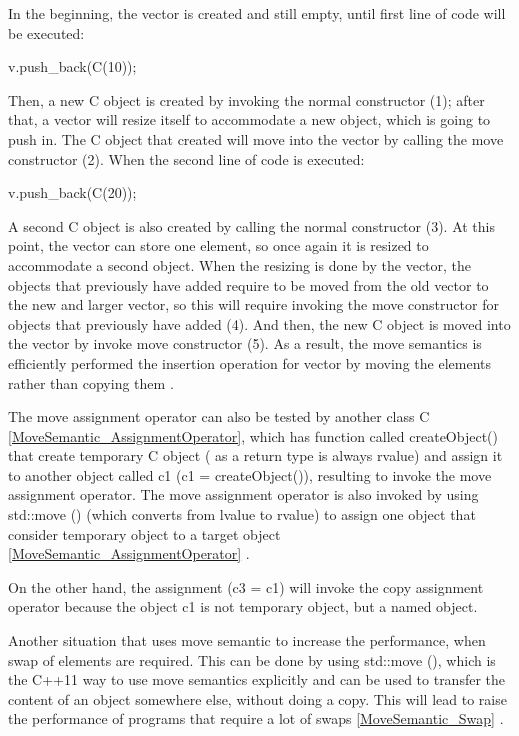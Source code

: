 \documentclass[11pt]{report}
\begin{document}
In the beginning, the vector is created and still empty, until first line of code will be executed:
\begin{center}
v.push\_back(C(10));
\end{center} 

Then, a new C object is created by invoking the normal constructor (1); after that, a vector will resize itself to accommodate a new object, which is going to push in. The C object that created will move into the vector by calling the move constructor (2). When the second line of code is executed:
\begin{center}
v.push\_back(C(20));
\end{center}

A second C object is also created by calling the normal constructor (3). At this point, the vector can store one element, so once again it is resized to accommodate a second object. When the resizing is done by the vector, the objects that previously have added require to be moved from the old vector to the new and larger vector, so this will require invoking the move constructor for objects that previously have added (4). And then, the new C object is moved into the vector by invoke move constructor (5). As a result, the move semantics is efficiently performed the insertion operation for vector by moving the elements rather than copying them \cite{MSDN:2012:CppModern}.


The move assignment operator can also be tested by another class C \ref{MoveSemantic_AssignmentOperator}, which has function called createObject() that create temporary C object ( as a return type is always rvalue) and assign it to another object called c1  (c1 = createObject()), resulting to invoke the move assignment operator. The move assignment operator is also invoked by using std::move () (which converts from lvalue to rvalue) to assign one object that consider temporary object to a target object \ref{MoveSemantic_AssignmentOperator} \cite{MSDN:2012:CppModern}.

On the other hand, the assignment (c3 = c1) will invoke the copy assignment operator because the object c1 is not temporary object, but a named object.


Another situation that uses move semantic to increase the performance, when swap of elements are required. This can be done by using std::move (), which is the C++11 way to use move semantics explicitly and can be used to transfer the content of an object somewhere else, without doing a copy. This will lead to raise the performance of programs that require a lot of swaps \ref{MoveSemantic_Swap} \cite{Gregorie:professionalcpp}.
\end{document}
